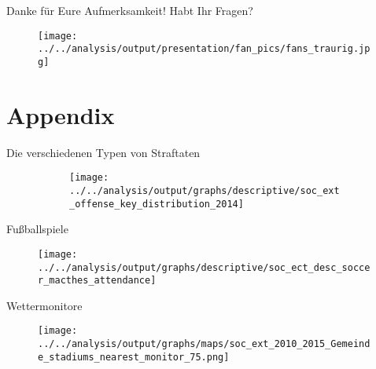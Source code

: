 \documentclass[usenames,dvipsnames,ngerman]{beamer} %
\begin{document}
\begin{frame}
	\begin{center}
		Danke für Eure Aufmerksamkeit! Habt Ihr Fragen?
	\end{center}
	\begin{figure}
		\texttt{[image: ../../analysis/output/presentation/fan\_pics/fans\_traurig.jpg]}
	\end{figure}

\end{frame}


\section*{Appendix}



\label{CRIMINAL_OFFENSE_CODES}
	\begin{frame}{Die verschiedenen Typen von Straftaten}
	\hyperlink{CRIME_DATA}{}
		\begin{figure}
			\begin{figure}
				\texttt{[image: ../../analysis/output/graphs/descriptive/soc\_ext\_offense\_key\_distribution\_2014]}
			\end{figure}
		\end{figure}
	\end{frame}

	\begin{frame}{Fußballspiele}\label{link_soccer_matches}
		\begin{figure}
			\texttt{[image: ../../analysis/output/graphs/descriptive/soc\_ect\_desc\_soccer\_macthes\_attendance]}
		\end{figure}
		\hyperlink{link_soccer_data}{}
	\end{frame}

	\begin{frame}{Wettermonitore}\label{link_map_stadiums}
		\hyperlink{link_weather_data}{}
		\begin{figure}
			\texttt{[image: ../../analysis/output/graphs/maps/soc\_ext\_2010\_2015\_Gemeinde\_stadiums\_nearest\_monitor\_75.png]}
		\end{figure}
	\end{frame}
\end{document}
